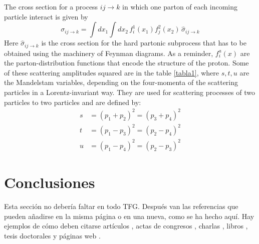 \documentclass[11pt,a4paper,twoside,pdf]{article}
\numberwithin{equation}{section}
\begin{document}
The cross section for a process $ij\rightarrow k$ in which one parton of each incoming particle interact is given by \cite{PYTHIA}
\begin{equation}
\sigma_{ij\rightarrow k}=\int dx_{1} \int dx_{2}\, f_{i}^{1}(x_{1}) f_{j}^2(x_{2})\,\widehat{\sigma}_{ij\rightarrow k}
\end{equation}
Here $\widehat{\sigma}_{ij\rightarrow k}$ is the cross section for the hard partonic subprocess that has to be obtained using the machinery of Feynman diagrams. As a reminder, $f_{i}^{a}(x)$ are the parton-distribution functions
that encode the structure of the proton. Some of these scattering amplitudes squared are in the table \ref{tabla1}, where $s,t,u$ are the Mandelstam variables, depending on the four-momenta of the scattering particles in a Lorentz-invariant way. They are used for scattering processes of two particles to two particles and are defined by:
\begin{align}
s&=(p_1+p_2)^2=(p_3+p_4)^2 \\
t&=(p_1-p_3)^2=(p_2-p_4)^2 \\
u&=(p_1-p_4)^2=(p_2-p_3)^2
\end{align}

\section{Conclusiones}

Esta sección no debería faltar en todo TFG. Después van las referencias que pueden añadirse en la misma página o en una nueva, como se ha hecho aquí. Hay ejemplos de cómo deben citarse artículos \cite{PYTHIA}, actas de congresos \cite{conferencia}, charlas \cite{charla}, libros \cite{libro}, tesis doctorales \cite{tesis} y páginas web \cite{web}.


\end{document}
